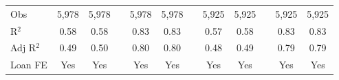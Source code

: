 {\begin{tabular}{l*{11}{c}}
\midrule
Obs                                     &    5,978         &    5,978         &         &    5,978         &    5,978         &         &    5,925         &    5,925         &         &    5,925         &    5,925         \\
R$^2$                                   &     0.58         &     0.58         &         &     0.83         &     0.83         &         &     0.57         &     0.58         &         &     0.83         &     0.83         \\
Adj R$^2$                               &     0.49         &     0.50         &         &     0.80         &     0.80         &         &     0.48         &     0.49         &         &     0.79         &     0.79         \\
Loan FE                                 &      Yes         &      Yes         &         &      Yes         &      Yes         &         &      Yes         &      Yes         &         &      Yes         &      Yes         \\
\bottomrule
\end{tabular}
}
